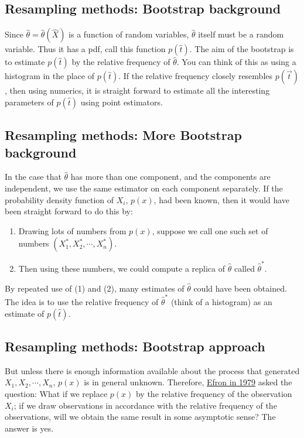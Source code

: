 \documentclass[%
oneside,                 %
final,                   %
10pt]{article}
\begin{document}
\noindent
\subsection*{Resampling methods: Bootstrap background}

Since $\widehat{\theta} = \widehat{\theta}(\hat{X})$ is a function of random variables,
$\widehat{\theta}$ itself must be a random variable. Thus it has
a pdf, call this function $p(\hat{t})$. The aim of the bootstrap is to
estimate $p(\hat{t})$ by the relative frequency of
$\widehat{\theta}$. You can think of this as using a histogram
in the place of $p(\hat{t})$. If the relative frequency closely
resembles $p(\vec{t})$, then using numerics, it is straight forward to
estimate all the interesting parameters of $p(\hat{t})$ using point
estimators.  

\subsection*{Resampling methods: More Bootstrap background}

In the case that $\widehat{\theta}$ has
more than one component, and the components are independent, we use the
same estimator on each component separately.  If the probability
density function of $X_i$, $p(x)$, had been known, then it would have
been straight forward to do this by: 
\begin{enumerate}
\item Drawing lots of numbers from $p(x)$, suppose we call one such set of numbers $(X_1^*, X_2^*, \cdots, X_n^*)$. 

\item Then using these numbers, we could compute a replica of $\widehat{\theta}$ called $\widehat{\theta}^*$. 
\end{enumerate}

\noindent
By repeated use of (1) and (2), many
estimates of $\widehat{\theta}$ could have been obtained. The
idea is to use the relative frequency of $\widehat{\theta}^*$
(think of a histogram) as an estimate of $p(\hat{t})$.

\subsection*{Resampling methods: Bootstrap approach}

But
unless there is enough information available about the process that
generated $X_1,X_2,\cdots,X_n$, $p(x)$ is in general
unknown. Therefore, \href{{https://projecteuclid.org/euclid.aos/1176344552}}{Efron in 1979}  asked the
question: What if we replace $p(x)$ by the relative frequency
of the observation $X_i$; if we draw observations in accordance with
the relative frequency of the observations, will we obtain the same
result in some asymptotic sense? The answer is yes.
\end{document}
